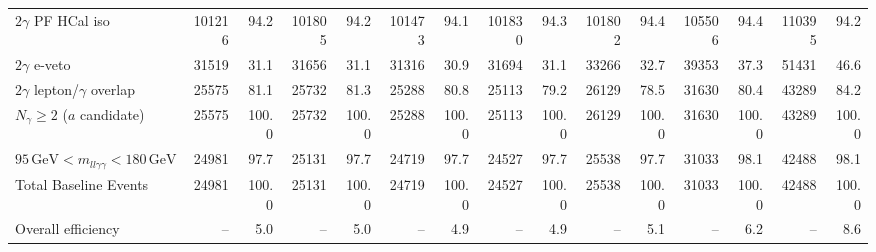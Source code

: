 \begin{table}[htbp]
{\begin{tabular}{lrrrrrrrrrrrrrr}
$2\gamma$ PF HCal iso & 101216 & 94.2 & 101805 & 94.2 & 101473 & 94.1 & 101830 & 94.3 & 101802 & 94.4 & 105506 & 94.4 & 110395 & 94.2 \\
$2\gamma$ e-veto & 31519 & 31.1 & 31656 & 31.1 & 31316 & 30.9 & 31694 & 31.1 & 33266 & 32.7 & 39353 & 37.3 & 51431 & 46.6 \\
$2\gamma$ lepton/$\gamma$ overlap & 25575 & 81.1 & 25732 & 81.3 & 25288 & 80.8 & 25113 & 79.2 & 26129 & 78.5 & 31630 & 80.4 & 43289 & 84.2 \\
$N_{\gamma}\geq 2$ ($a$ candidate) & 25575 & 100.0 & 25732 & 100.0 & 25288 & 100.0 & 25113 & 100.0 & 26129 & 100.0 & 31630 & 100.0 & 43289 & 100.0 \\
$95\,\mathrm{GeV} < m_{ll\gamma\gamma} < 180\,\mathrm{GeV}$ & 24981 & 97.7 & 25131 & 97.7 & 24719 & 97.7 & 24527 & 97.7 & 25538 & 97.7 & 31033 & 98.1 & 42488 & 98.1 \\
Total Baseline Events & 24981 & 100.0 & 25131 & 100.0 & 24719 & 100.0 & 24527 & 100.0 & 25538 & 100.0 & 31033 & 100.0 & 42488 & 100.0 \\
\hline
Overall efficiency & -- & 5.0 & -- & 5.0 & -- & 4.9 & -- & 4.9 & -- & 5.1 & -- & 6.2 & -- & 8.6 \\
\hline
\end{tabular}%
}
\end{table}

